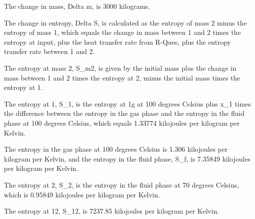 The change in mass, Delta m, is 3000 kilograms.

The change in entropy, Delta S, is calculated as the entropy of mass 2 minus the entropy of mass 1, which equals the change in mass between 1 and 2 times the entropy at input, plus the heat transfer rate from R-Ques, plus the entropy transfer rate between 1 and 2.

The entropy at mass 2, S_m2, is given by the initial mass plus the change in mass between 1 and 2 times the entropy at 2, minus the initial mass times the entropy at 1.

The entropy at 1, S_1, is the entropy at 1g at 100 degrees Celsius plus x_1 times the difference between the entropy in the gas phase and the entropy in the fluid phase at 100 degrees Celsius, which equals 1.33774 kilojoules per kilogram per Kelvin.

The entropy in the gas phase at 100 degrees Celsius is 1.306 kilojoules per kilogram per Kelvin, and the entropy in the fluid phase, S_f, is 7.35849 kilojoules per kilogram per Kelvin.

The entropy at 2, S_2, is the entropy in the fluid phase at 70 degrees Celsius, which is 0.95849 kilojoules per kilogram per Kelvin.

The entropy at 12, S_12, is 7237.85 kilojoules per kilogram per Kelvin.
